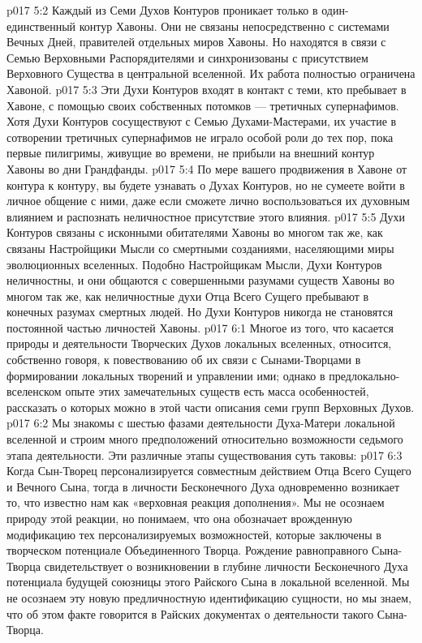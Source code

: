 \vs p017 5:2 Каждый из Семи Духов Контуров проникает только в один\hyp{}единственный контур Хавоны. Они не связаны непосредственно с системами Вечных Дней, правителей отдельных миров Хавоны. Но находятся в связи с Семью Верховными Распорядителями и синхронизованы с присутствием Верховного Существа в центральной вселенной. Их работа полностью ограничена Хавоной.
\vs p017 5:3 Эти Духи Контуров входят в контакт с теми, кто пребывает в Хавоне, с помощью своих собственных потомков --- третичных супернафимов. Хотя Духи Контуров сосуществуют с Семью Духами\hyp{}Мастерами, их участие в сотворении третичных супернафимов не играло особой роли до тех пор, пока первые пилигримы, живущие во времени, не прибыли на внешний контур Хавоны во дни Грандфанды.
\vs p017 5:4 По мере вашего продвижения в Хавоне от контура к контуру, вы будете узнавать о Духах Контуров, но не сумеете войти в личное общение с ними, даже если сможете лично воспользоваться их духовным влиянием и распознать неличностное присутствие этого влияния.
\vs p017 5:5 Духи Контуров связаны с исконными обитателями Хавоны во многом так же, как связаны Настройщики Мысли со смертными созданиями, населяющими миры эволюционных вселенных. Подобно Настройщикам Мысли, Духи Контуров неличностны, и они общаются с совершенными разумами существ Хавоны во многом так же, как неличностные духи Отца Всего Сущего пребывают в конечных разумах смертных людей. Но Духи Контуров никогда не становятся постоянной частью личностей Хавоны.
\vs p017 6:1 Многое из того, что касается природы и деятельности Творческих Духов локальных вселенных, относится, собственно говоря, к повествованию об их связи с Сынами\hyp{}Творцами в формировании локальных творений и управлении ими; однако в предлокально\hyp{}вселенском опыте этих замечательных существ есть масса особенностей, рассказать о которых можно в этой части описания семи групп Верховных Духов.
\vs p017 6:2 \pc Мы знакомы с шестью фазами деятельности Духа\hyp{}Матери локальной вселенной и строим много предположений относительно возможности седьмого этапа деятельности. Эти различные этапы существования суть таковы:
\vs p017 6:3 \bibnobreakspace {} Когда Сын\hyp{}Творец персонализируется совместным действием Отца Всего Сущего и Вечного Сына, тогда в личности Бесконечного Духа одновременно возникает то, что известно нам как «верховная реакция дополнения». Мы не осознаем природу этой реакции, но понимаем, что она обозначает врожденную модификацию тех персонализируемых возможностей, которые заключены в творческом потенциале Объединенного Творца. Рождение равноправного Сына\hyp{}Творца свидетельствует о возникновении в глубине личности Бесконечного Духа потенциала будущей союзницы этого Райского Сына в локальной вселенной. Мы не осознаем эту новую предличностную идентификацию сущности, но мы знаем, что об этом факте говорится в Райских документах о деятельности такого Сына\hyp{}Творца.
